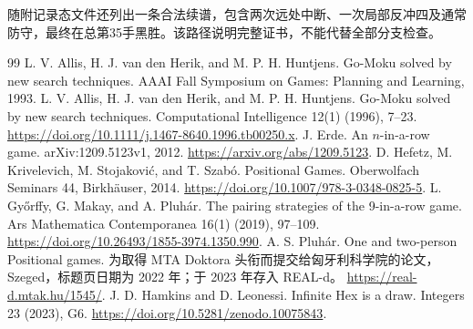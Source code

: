 \documentclass[11pt]{article}
\theoremstyle{definition}
\theoremstyle{remark}
\begin{document}
随附记录态文件还列出一条合法续谱，包含两次远处中断、一次局部反冲四及通常防守，最终在总第35手黑胜。该路径说明完整证书，不能代替全部分支检查。

\begin{thebibliography}{99}
\setlength{\itemsep}{0pt}\setlength{\parskip}{0pt}
 L. V. Allis, H. J. van den Herik, and M. P. H. Huntjens.
Go-Moku solved by new search techniques. AAAI Fall Symposium on Games:
Planning and Learning, 1993.
 L. V. Allis, H. J. van den Herik, and M. P. H. Huntjens.
Go-Moku solved by new search techniques. Computational Intelligence
12(1) (1996), 7--23.
\url{https://doi.org/10.1111/j.1467-8640.1996.tb00250.x}.
 J. Erde. An $n$-in-a-row game.
arXiv:1209.5123v1, 2012.
\url{https://arxiv.org/abs/1209.5123}.
 D. Hefetz, M. Krivelevich, M. Stojakovi\'c, and T. Szab\'o.
Positional Games. Oberwolfach Seminars 44, Birkh\"auser, 2014.
\url{https://doi.org/10.1007/978-3-0348-0825-5}.
 L. Gy\H{o}rffy, G. Makay, and A. Pluh\'ar.
The pairing strategies of the 9-in-a-row game.
Ars Mathematica Contemporanea 16(1) (2019), 97--109.
\url{https://doi.org/10.26493/1855-3974.1350.990}.
 A. S. Pluh\'ar. One and two-person Positional games.
为取得 MTA Doktora 头衔而提交给匈牙利科学院的论文，Szeged，标题页日期为 2022 年；于 2023 年存入 REAL-d。
\url{https://real-d.mtak.hu/1545/}.
 J. D. Hamkins and D. Leonessi.
Infinite Hex is a draw. Integers 23 (2023), G6.
\url{https://doi.org/10.5281/zenodo.10075843}.
\end{thebibliography}
\end{document}

